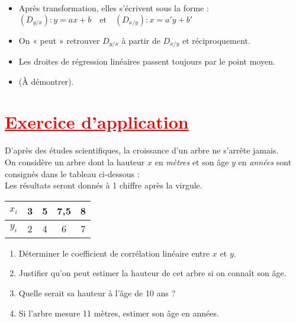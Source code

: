 \documentclass[12pt,a4paper]{article}
\begin{document}
\begin{itemize}
    \item Après transformation, elles s’écrivent sous la forme : \\
    \( (D_{y/x}) : y = ax + b \quad \text{et} \quad (D_{x/y}) : x = a'y + b' \)
    
    \item On « peut » retrouver \( D_{y/x} \) à partir de \( D_{x/y} \) et réciproquement.

    \item Les droites de régression linéaires passent toujours par le point moyen.

    \item 
     \quad (À démontrer).
\end{itemize}
\noindent
\section*{\textcolor{red}{\underline{Exercice d’application}}}

D’après des études scientifiques, la croissance d’un arbre ne s’arrête jamais.\\
On considère un arbre dont la hauteur \( x \) en \textit{mètres} et son âge \( y \) en \textit{années} sont consignés dans le tableau ci-dessous :\\
Les résultats seront donnés à 1 chiffre après la virgule.

\vspace{0.5cm}

\begin{center}
\begin{tabular}{|c|c|c|c|c|}
\hline
\( x_i \) & 3 & 5 & 7{,}5 & 8 \\
\hline
\( y_i \) & 2 & 4 & 6 & 7 \\
\hline
\end{tabular}
\end{center}

\vspace{0.5cm}

\begin{enumerate}
    \item Déterminer le coefficient de corrélation linéaire entre \( x \) et \( y \).
    \item Justifier qu’on peut estimer la hauteur de cet arbre si on connaît son âge.
    \item Quelle serait sa hauteur à l’âge de 10 ans ?
    \item Si l’arbre mesure 11 mètres, estimer son âge en années.
\end{enumerate}
\end{document}
